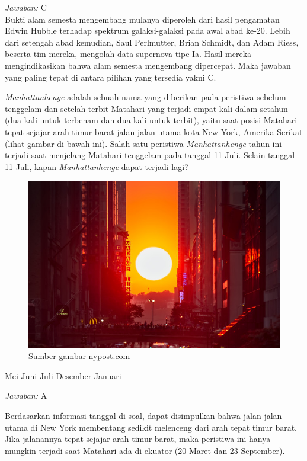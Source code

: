 \documentclass[11pt,fleqn]{exam}
\begin{document}
\begin{questions}
\textit{Jawaban: }C\\
Bukti alam semesta mengembang mulanya diperoleh dari hasil pengamatan Edwin Hubble terhadap spektrum galaksi-galaksi pada awal abad ke-20. Lebih dari setengah abad kemudian, Saul Perlmutter, Brian Schmidt, dan Adam Riess, beserta tim mereka, mengolah data supernova tipe Ia. Hasil mereka mengindikasikan bahwa alam semesta mengembang dipercepat. Maka jawaban yang paling tepat di antara pilihan yang tersedia yakni C.

\question \textit{Manhattanhenge} adalah sebuah nama yang diberikan pada peristiwa sebelum tenggelam dan setelah terbit Matahari yang terjadi empat kali dalam setahun (dua kali untuk terbenam dan dua kali untuk terbit), yaitu saat posisi Matahari tepat sejajar arah timur-barat jalan-jalan utama kota New York, Amerika Serikat (lihat gambar di bawah ini). Salah satu peristiwa \textit{Manhattanhenge} tahun ini terjadi saat menjelang Matahari tenggelam pada tanggal 11 Juli. Selain tanggal 11 Juli, kapan \textit{Manhattanhenge} dapat terjadi lagi?
\begin{figure}[H]
\centering
\includegraphics[scale=0.4]{manhattanhenge.jpg}
\caption{Sumber gambar nypost.com}
\end{figure}
\begin{choices}
 Mei
 Juni
 Juli
 Desember
 Januari
\end{choices}

\textit{Jawaban: }A

Berdasarkan informasi tanggal di soal, dapat disimpulkan bahwa jalan-jalan utama di New York membentang sedikit melenceng dari arah tepat timur barat. Jika jalanannya tepat sejajar arah timur-barat, maka peristiwa ini hanya mungkin terjadi saat Matahari ada di ekuator (20 Maret dan 23 September).


\end{questions}
\end{document}
